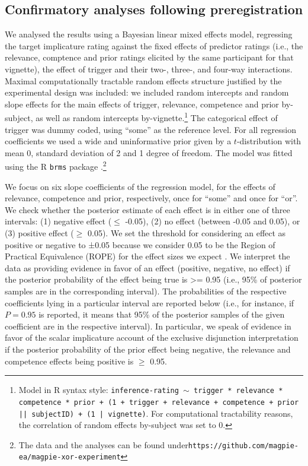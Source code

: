 \documentclass{sp}
\begin{document}
\subsection{Confirmatory analyses following preregistration}

We analysed the results using a Bayesian linear mixed effects model, regressing the target implicature rating against the fixed effects of predictor ratings (i.e., the relevance, comptence and prior ratings elicited by the same participant for that vignette), the effect of trigger and their two-, three-, and four-way interactions. Maximal computationally tractable random effects structure justified by the experimental design was included: we included random intercepts and random slope effects for the main effects of trigger, relevance, competence and prior by-subject, as well as random intercepts by-vignette.\footnote{Model in R syntax style: \texttt{inference-rating $\sim$ trigger * relevance * competence * prior + (1 + trigger + relevance + competence + prior || subjectID) + (1 | vignette)}. For computational tractability reasons, the correlation of random effects by-subject was set to 0.}
The categorical effect of trigger was dummy coded, using ``some'' as the reference level. For all regression coefficients we used a wide and uninformative prior given by a $t$-distribution with mean 0, standard deviation of 2 and 1 degree of freedom. The model was fitted using the R \texttt{brms} package \citep{burkner2017brms}.\footnote{The data and the analyses can be found under\newline \texttt{https://github.com/magpie-ea/magpie-xor-experiment}}

We focus on six slope coefficients of the regression model, for the effects of relevance, competence and prior, respectively, once for ``some'' and once for ``or''. We check whether the posterior estimate of each effect is in either one of three intervals: (1) negative effect ($\le$ -0.05), (2) no effect (between -0.05 and 0.05), or (3) positive effect ($\ge$ 0.05). We set the threshold for considering an effect as positive or negative to ±0.05 because we consider 0.05 to be the Region of Practical Equivalence (ROPE) for the effect sizes we expect \citep{kruschke2014doing}.
We interpret the data as providing evidence in favor of an effect (positive, negative, no effect) if the posterior probability of the effect being true is >= 0.95 (i.e., 95\% of posterior samples are in the corresponding interval). The probabilities of the respective coefficients lying in a particular interval are reported below (i.e., for instance, if $P=0.95$ is reported, it means that 95\% of the posterior samples of the given coefficient are in the respective interval). In particular, we speak of evidence in favor of the scalar implicature account of the exclusive disjunction interpretation if the posterior probability of the prior effect being negative, the relevance and competence effects being positive is $\ge$ 0.95.
\end{document}
